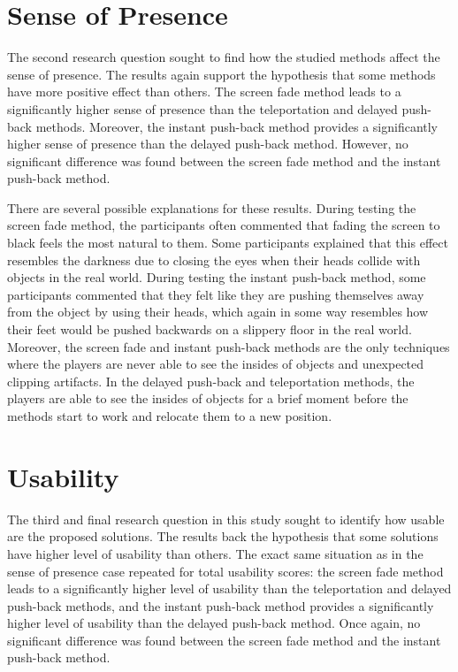 \section{Sense of Presence}

The second research question sought to find how the studied methods affect the sense of presence. The results again support the hypothesis that some methods have more positive effect than others. The screen fade method leads to a significantly higher sense of presence than the teleportation and delayed push-back methods. Moreover, the instant push-back method provides a significantly higher sense of presence than the delayed push-back method. However, no significant difference was found between the screen fade method and the instant push-back method.

There are several possible explanations for these results. During testing the screen fade method, the participants often commented that fading the screen to black feels the most natural to them. Some participants explained that this effect resembles the darkness due to closing the eyes when their heads collide with objects in the real world. During testing the instant push-back method, some participants commented that they felt like they are pushing themselves away from the object by using their heads, which again in some way resembles how their feet would be pushed backwards on a slippery floor in the real world. Moreover, the screen fade and instant push-back methods are the only techniques where the players are never able to see the insides of objects and unexpected clipping artifacts. In the delayed push-back and teleportation methods, the players are able to see the insides of objects for a brief moment before the methods start to work and relocate them to a new position.

\section{Usability}

The third and final research question in this study sought to identify how usable are the proposed solutions. The results back the hypothesis that some solutions have higher level of usability than others. The exact same situation as in the sense of presence case repeated for total usability scores: the screen fade method leads to a significantly higher level of usability than the teleportation and delayed push-back methods, and the instant push-back method provides a significantly higher level of usability than the delayed push-back method. Once again, no significant difference was found between the screen fade method and the instant push-back method.

